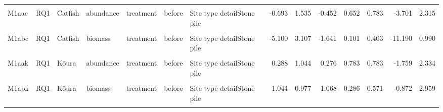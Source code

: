 \documentclass[
  12pt,
  a4paper,
  oneside]{scrbook}
\begin{document}
\begin{landscape}
\begin{longtable}[t]{lllllllrrrrrrr}
\endfoot
\bottomrule
\endlastfoot
\cellcolor{gray!8}{M1aac} & \cellcolor{gray!8}{RQ1} & \cellcolor{gray!8}{Catfish} & \cellcolor{gray!8}{abundance} & \cellcolor{gray!8}{treatment} & \cellcolor{gray!8}{before} & \cellcolor{gray!8}{(Intercept)} & \cellcolor{gray!8}{-2.303} & \cellcolor{gray!8}{0.908} & \cellcolor{gray!8}{-2.535} & \cellcolor{gray!8}{0.011} & \cellcolor{gray!8}{NA} & \cellcolor{gray!8}{-4.083} & \cellcolor{gray!8}{-0.522}\\
M1aac & RQ1 & Catfish & abundance & treatment & before & Site type detailStone pile & -0.693 & 1.535 & -0.452 & 0.652 & 0.783 & -3.701 & 2.315\\
\cellcolor{gray!8}{M1abc} & \cellcolor{gray!8}{RQ1} & \cellcolor{gray!8}{Catfish} & \cellcolor{gray!8}{biomass} & \cellcolor{gray!8}{treatment} & \cellcolor{gray!8}{before} & \cellcolor{gray!8}{(Intercept)} & \cellcolor{gray!8}{3.203} & \cellcolor{gray!8}{1.279} & \cellcolor{gray!8}{2.504} & \cellcolor{gray!8}{0.012} & \cellcolor{gray!8}{NA} & \cellcolor{gray!8}{0.696} & \cellcolor{gray!8}{5.709}\\
M1abc & RQ1 & Catfish & biomass & treatment & before & Site type detailStone pile & -5.100 & 3.107 & -1.641 & 0.101 & 0.403 & -11.190 & 0.990\\
\cellcolor{gray!8}{M1aak} & \cellcolor{gray!8}{RQ1} & \cellcolor{gray!8}{Kōura} & \cellcolor{gray!8}{abundance} & \cellcolor{gray!8}{treatment} & \cellcolor{gray!8}{before} & \cellcolor{gray!8}{(Intercept)} & \cellcolor{gray!8}{-1.897} & \cellcolor{gray!8}{0.785} & \cellcolor{gray!8}{-2.415} & \cellcolor{gray!8}{0.016} & \cellcolor{gray!8}{NA} & \cellcolor{gray!8}{-3.437} & \cellcolor{gray!8}{-0.358}\\
\addlinespace
M1aak & RQ1 & Kōura & abundance & treatment & before & Site type detailStone pile & 0.288 & 1.044 & 0.276 & 0.783 & 0.783 & -1.759 & 2.334\\
\cellcolor{gray!8}{M1abk} & \cellcolor{gray!8}{RQ1} & \cellcolor{gray!8}{Kōura} & \cellcolor{gray!8}{biomass} & \cellcolor{gray!8}{treatment} & \cellcolor{gray!8}{before} & \cellcolor{gray!8}{(Intercept)} & \cellcolor{gray!8}{1.030} & \cellcolor{gray!8}{0.830} & \cellcolor{gray!8}{1.241} & \cellcolor{gray!8}{0.215} & \cellcolor{gray!8}{NA} & \cellcolor{gray!8}{-0.597} & \cellcolor{gray!8}{2.656}\\
M1abk & RQ1 & Kōura & biomass & treatment & before & Site type detailStone pile & 1.044 & 0.977 & 1.068 & 0.286 & 0.571 & -0.872 & 2.959\\
\cellcolor{gray!8}{M1bac} & \cellcolor{gray!8}{RQ1} & \cellcolor{gray!8}{Catfish} & \cellcolor{gray!8}{abundance} & \cellcolor{gray!8}{reference} & \cellcolor{gray!8}{before} & \cellcolor{gray!8}{(Intercept)} & \cellcolor{gray!8}{-102.299} & \cellcolor{gray!8}{32.656} & \cellcolor{gray!8}{-3.133} & \cellcolor{gray!8}{0.002} & \cellcolor{gray!8}{NA} & \cellcolor{gray!8}{-166.303} & \cellcolor{gray!8}{-38.295}\\

\end{longtable}
\end{landscape}
\end{document}
